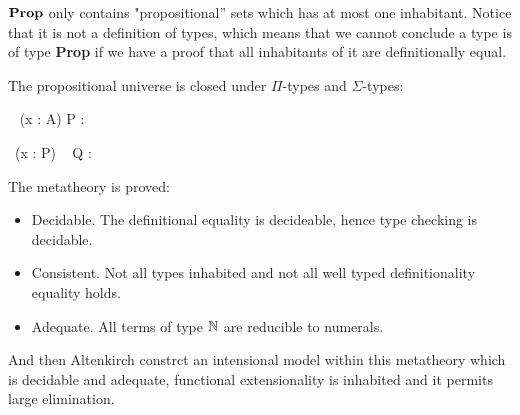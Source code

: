 




 $\operatorname{\mathbf{Prop}}$ only contains "propositional'' sets which has at most one
inhabitant. Notice that it is not a definition of types, which means
that we cannot conclude a type is of type \textbf{Prop} if we have a
proof that all inhabitants of it are definitionally equal.

The propositional universe is closed under $\Pi$-types and $\Sigma$-types:



{\Gamma \vdash \Pi~ (x : A) \to P : \Prop}



{\Gamma \vdash \Sigma ~(x : P) ~ Q : \Prop}


The metatheory is proved:

\begin{itemize}
\item Decidable. The definitional equality is decideable, hence type checking is decidable.

\item Consistent. Not all types inhabited and not all well typed definitionality equality holds. 

\item Adequate. All terms of type $\mathbb{N}$ are reducible to numerals.
\end{itemize}


And then Altenkirch constrct an intensional model within this metatheory which is decidable and adequate, functional extensionality is inhabited and it permits large elimination. 





